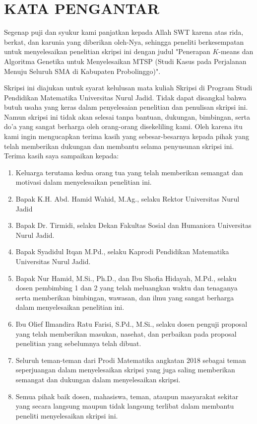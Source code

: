 \newpage
\chapter*{KATA PENGANTAR}

Segenap puji dan syukur kami panjatkan kepada Allah SWT karena atas rida, berkat, dan karunia yang diberikan oleh-Nya, sehingga peneliti berkesempatan untuk menyelesaikan penelitian skripsi ini dengan judul "Penerapan $K$-means dan Algoritma Genetika untuk Menyelesaikan MTSP (Studi Kasus pada Perjalanan Menuju Seluruh SMA di Kabupaten Probolinggo)".

Skripsi ini diajukan untuk syarat kelulusan mata kuliah Skripsi di Program Studi Pendidikan Matematika Universitas Nurul Jadid. Tidak dapat disangkal bahwa butuh usaha yang keras dalam penyelesaian penelitian dan penulisan skripsi ini. Namun skripsi ini tidak akan selesai tanpa bantuan, dukungan, bimbingan, serta do'a yang sangat berharga oleh orang-orang disekeliling kami. Oleh karena itu kami ingin mengucapkan terima kasih yang sebesar-besarnya kepada pihak yang telah memberikan dukungan dan membantu selama penyusunan skripsi ini. Terima kasih saya sampaikan kepada:

\begin{enumerate}
	\item Keluarga terutama kedua orang tua yang telah memberikan semangat dan motivasi dalam menyelesaikan penelitian ini.
	\item Bapak K.H. Abd. Hamid Wahid, M.Ag., selaku Rektor Universitas Nurul Jadid
	\item Bapak Dr. Tirmidi, selaku Dekan Fakultas Sosial dan Humaniora Universitas Nurul Jadid.
	\item Bapak Syadidul Itqan M.Pd., selaku Kaprodi Pendidikan Matematika Universitas Nurul Jadid.
	\item Bapak Nur Hamid, M.Si., Ph.D., dan Ibu Shofia Hidayah, M.Pd., selaku dosen pembimbing 1 dan 2 yang telah meluangkan waktu dan tenaganya serta memberikan bimbingan, wawasan, dan ilmu yang sangat berharga dalam menyelesaikan penelitian ini.
	\item Ibu Olief Ilmandira Ratu Farisi, S.Pd., M.Si., selaku dosen penguji proposal yang telah memberikan masukan, nasehat, dan perbaikan pada proposal penelitian yang sebelumnya telah dibuat.
	\item Seluruh teman-teman dari Prodi Matematika angkatan 2018 sebagai teman seperjuangan dalam menyelesaikan skripsi yang juga saling memberikan semangat dan dukungan dalam menyelesaikan skripsi.
	\item Semua pihak baik dosen, mahasiswa, teman, ataupun masyarakat sekitar yang secara langsung maupun tidak langsung terlibat dalam membantu peneliti menyelesaikan skripsi ini.
\end{enumerate}

